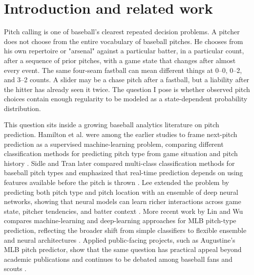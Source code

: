 \documentclass[9pt,twoside]{pnas-new}
\begin{document}

\maketitle
\thispagestyle{firststyle}

\Firstpage

\section*{Introduction and related work}

Pitch calling is one of baseball's clearest repeated decision problems. A pitcher does not choose from the entire vocabulary of baseball pitches. He chooses from his own repertoire or "arsenal" against a particular batter, in a particular count, after a sequence of prior pitches, with a game state that changes after almost every event. The same four-seam fastball can mean different things at 0--0, 0--2, and 3--2 counts. A slider may be a chase pitch after a fastball, but a liability after the hitter has already seen it twice. The question I pose is whether observed pitch choices contain enough regularity to be modeled as a state-dependent probability distribution.

This question sits inside a growing baseball analytics literature on pitch prediction. Hamilton et al. were among the earlier studies to frame next-pitch prediction as a supervised machine-learning problem, comparing different classification methods for predicting pitch type from game situation and pitch history \cite{hamilton2014pitch}. Sidle and Tran later compared multi-class classification methods for baseball pitch types and emphasized that real-time prediction depends on using features available before the pitch is thrown \cite{sidle2018multiclass}. Lee extended the problem by predicting both pitch type and pitch location with an ensemble of deep neural networks, showing that neural models can learn richer interactions across game state, pitcher tendencies, and batter context \cite{lee2022pitch}. More recent work by Lin and Wu compares machine-learning and deep-learning approaches for MLB pitch-type prediction, reflecting the broader shift from simple classifiers to flexible ensemble and neural architectures \cite{lin2025pitchtype}. Applied public-facing projects, such as Augustine's MLB pitch predictor, show that the same question has practical appeal beyond academic publications and continues to be debated among baseball fans and scouts \cite{augustine2024pitchpredictor}.
\end{document}
